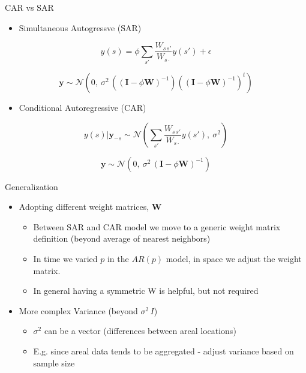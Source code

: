 \documentclass[11pt,ignorenonframetext,]{beamer}
\providecommand{\tightlist}{%
  \setlength{\itemsep}{0pt}\setlength{\parskip}{0pt}}
\begin{document}
\begin{frame}{CAR vs SAR}

\begin{itemize}
\tightlist
\item
  Simultaneous Autogressve (SAR)
\end{itemize}

\[ y(s) = \phi \sum_{s'} \frac{W_{s\,s'}}{W_{s\,\boldsymbol{\cdot}}} y(s') + \epsilon \]

\[ \bm{y} \sim \mathcal{N}(0,~\sigma^2 \, ((\bm{I}-\phi \bm{W})^{-1}) ((\bm{I}-\phi \bm{W})^{-1})^t )\]

\begin{itemize}
\tightlist
\item
  Conditional Autoregressive (CAR)
\end{itemize}

\[ y(s)|\bm{y}_{-s} \sim \mathcal{N}\left(\sum_{s'} \frac{W_{s\,s'}}{W_{s\,\boldsymbol{\cdot}}} y(s'),~ \sigma^2 \right) \]

\[ \bm{y} \sim \mathcal{N}(0,~\sigma^2 \, (\bm{I}-\phi \bm{W})^{-1})\]

\end{frame}

\begin{frame}{Generalization}

\begin{itemize}
\item
  Adopting different weight matrices, \(\bm{W}\)

  \begin{itemize}
  \item
    Between SAR and CAR model we move to a generic weight matrix
    definition (beyond average of nearest neighbors)
  \item
    In time we varied \(p\) in the \(AR(p)\) model, in space we adjust
    the weight matrix.
  \item
    In general having a symmetric W is helpful, but not required
  \end{itemize}
\item
  More complex Variance (beyond \(\sigma^2 \, I\))

  \begin{itemize}
  \item
    \(\sigma^2\) can be a vector (differences between areal locations)
  \item
    E.g. since areal data tends to be aggregated - adjust variance based
    on sample size
  \end{itemize}
\end{itemize}

\end{frame}
\end{document}
